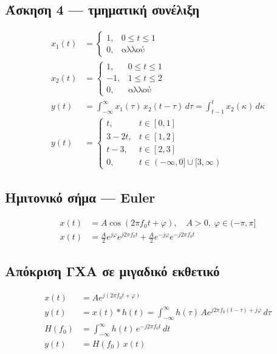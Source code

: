 \documentclass[11pt,a4paper]{article}
\begin{document}
\subsection{Άσκηση 4 — τμηματική συνέλιξη}
\begin{align}
x_1(t) &= \begin{cases} 1, & 0 \le t \le 1 \\ 0, & \text{αλλού} \end{cases} \\
x_2(t) &= \begin{cases} 1, & 0 \le t \le 1 \\ -1, & 1 \le t \le 2 \\ 0, & \text{αλλού} \end{cases} \\
y(t) &= \int_{-\infty}^{\infty} x_1(\tau)\,x_2(t-\tau)\,d\tau
     = \int_{t-1}^{t} x_2(\kappa)\,d\kappa \\
y(t) &= \begin{cases}
  t, & t \in [0,1] \\
  3-2t, & t \in [1,2] \\
  t-3, & t \in [2,3] \\
  0, & t \in (-\infty,0] \cup [3,\infty)
\end{cases}
\end{align}

\subsection{Ημιτονικό σήμα — Euler}
\begin{align}
x(t) &= A\cos(2\pi f_0 t + \varphi), \quad A>0,\; \varphi \in (-\pi,\pi] \\
x(t) &= \frac{A}{2}e^{j\varphi}e^{j2\pi f_0 t} + \frac{A}{2}e^{-j\varphi}e^{-j2\pi f_0 t}
\end{align}

\subsection{Απόκριση ΓΧΑ σε μιγαδικό εκθετικό}
\begin{align}
x(t) &= A e^{j(2\pi f_0 t + \varphi)} \\
y(t) &= x(t)\ast h(t) = \int_{-\infty}^{\infty} h(\tau)\,A e^{j2\pi f_0(t-\tau)+j\varphi}\,d\tau \\
H(f_0) &= \int_{-\infty}^{\infty} h(t)\,e^{-j2\pi f_0 t}\,dt \\
y(t) &= H(f_0)\,x(t)
\end{align}
\end{document}
